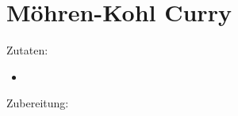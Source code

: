 \section{Möhren-Kohl Curry}
Zutaten:
\begin{itemize}
    \item
\end{itemize}

Zubereitung:

\newpage
\mbox{}
\vfill
\begin{center}
\end{center}
\vfill
\mbox{ }
\newpage
